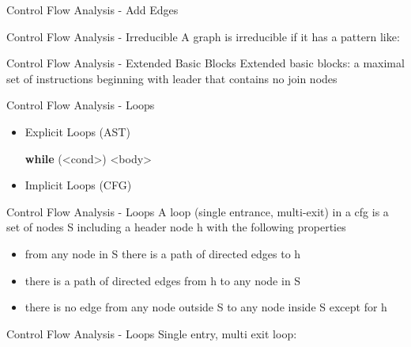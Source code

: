 \documentclass[mcgill,slideColor,colorBG,pdf]{prosper}
\begin{document}
\begin{slide} {Control Flow Analysis - Add Edges}
\begin{center}
\end{center}
\end{slide}

\begin{slide} {Control Flow Analysis - Irreducible}
A graph is irreducible if it has a pattern like:
\begin{center}
\end{center}
\end{slide}

\begin{slide} {Control Flow Analysis - Extended Basic Blocks}
Extended basic blocks: a maximal set of instructions beginning with leader that contains no join nodes
\end{slide}

\begin{slide} {Control Flow Analysis - Loops}
\begin{itemize}
\item Explicit Loops (AST)\\ 
\begin{center}
\textbf{while} (<cond>) <body>
\end{center}
\item Implicit Loops (CFG)
\end{itemize}
\begin{center}
\end{center}
\end{slide}

\begin{slide} {Control Flow Analysis - Loops}
A loop (single entrance, multi-exit) in a cfg is a set of nodes S including a header node h with the following properties
\begin{itemize}
\item from any node in S there is a path of directed edges to h 
\item there is a path of directed edges from h to any node in S
\item there is no edge from any node outside S to any node inside S except for h
\end{itemize}
\end{slide}

\begin{slide} {Control Flow Analysis - Loops}
Single entry, multi exit loop:\\
\ \\
\begin{center}
\end{center}
\end{slide}
\end{document}
